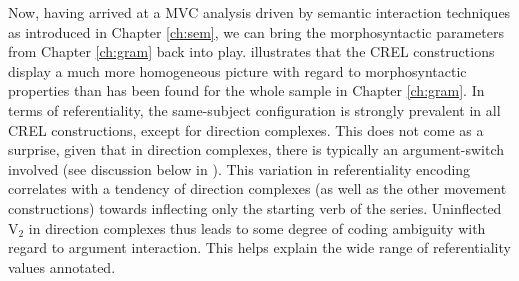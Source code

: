 
Now, having arrived at a MVC analysis driven by semantic interaction techniques as introduced in Chapter \ref{ch:sem}, we can bring the morphosyntactic parameters from Chapter \ref{ch:gram} back into play.  illustrates that the CREL constructions display a much more homogeneous picture with regard to morphosyntactic properties than has been found for the whole sample in Chapter \ref{ch:gram}. In terms of referentiality, the same-subject configuration is strongly prevalent in all CREL constructions, except for direction complexes. This does not come as a surprise, given that in direction complexes, there is typically an argument-switch involved (see discussion below in ). This variation in referentiality encoding correlates with a tendency of direction complexes (as well as the other movement constructions) towards inflecting only the starting verb of the series. Uninflected V$_2$ in direction complexes thus leads to some degree of coding ambiguity with regard to argument interaction. This helps explain the wide range of referentiality values annotated.

